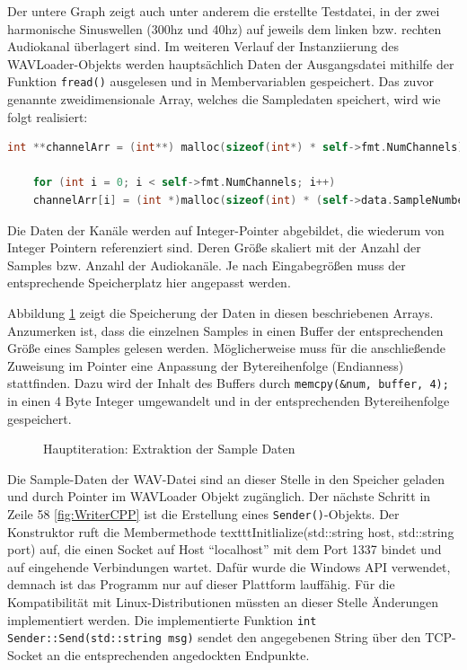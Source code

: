 Der untere Graph zeigt auch unter anderem die erstellte Testdatei, in der zwei harmonische Sinuswellen (300hz und 40hz) auf jeweils dem linken bzw. rechten Audiokanal überlagert sind.
Im weiteren Verlauf der Instanziierung des WAVLoader-Objekts werden hauptsächlich Daten der Ausgangsdatei mithilfe der Funktion \texttt{fread()} ausgelesen und in Membervariablen gespeichert. Das zuvor genannte zweidimensionale Array, welches die Sampledaten speichert, wird wie folgt realisiert:

\newpage
\begin{lstlisting}[language=C, frame=none]
	int **channelArr = (int**) malloc(sizeof(int*) * self->fmt.NumChannels);
	
	for (int i = 0; i < self->fmt.NumChannels; i++)
	channelArr[i] = (int *)malloc(sizeof(int) * (self->data.SampleNumber) + 1);
\end{lstlisting} 

Die Daten der Kanäle werden auf Integer-Pointer abgebildet, die wiederum von Integer Pointern referenziert sind. Deren Größe skaliert mit der Anzahl der Samples bzw. Anzahl der Audiokanäle. Je nach Eingabegrößen muss der entsprechende Speicherplatz hier angepasst werden.

Abbildung \ref{fig:extractionSamples} zeigt die Speicherung der Daten in diesen beschriebenen Arrays. Anzumerken ist, dass die einzelnen Samples in einen Buffer der entsprechenden Größe eines Samples gelesen werden. Möglicherweise muss für die anschließende Zuweisung im Pointer eine Anpassung der Bytereihenfolge (Endianness) stattfinden. Dazu wird der Inhalt des Buffers durch \texttt{memcpy(\&num, buffer, 4);} in einen 4 Byte Integer umgewandelt und in der entsprechenden Bytereihenfolge gespeichert.

\begin{figure}[h!]
	
	\caption{Hauptiteration: Extraktion der Sample Daten}
	\label{fig:extractionSamples}
\end{figure}

Die Sample-Daten der WAV-Datei sind an dieser Stelle in den Speicher geladen und durch Pointer im WAVLoader Objekt zugänglich. Der nächste Schritt in Zeile 58 \ref{fig:WriterCPP} ist die Erstellung eines \texttt{Sender()}-Objekts. Der Konstruktor ruft die Membermethode texttt{Initlialize(std::string host, std::string port)} auf, die einen Socket auf Host \enquote{localhost} mit dem Port 1337 bindet und auf eingehende Verbindungen wartet. Dafür wurde die Windows API verwendet, demnach ist das Programm nur auf dieser Plattform lauffähig. Für die Kompatibilität mit Linux-Distributionen müssten an dieser Stelle Änderungen implementiert werden. Die implementierte Funktion \texttt{int Sender::Send(std::string msg)} sendet den angegebenen String über den TCP-Socket an die entsprechenden angedockten Endpunkte. 


